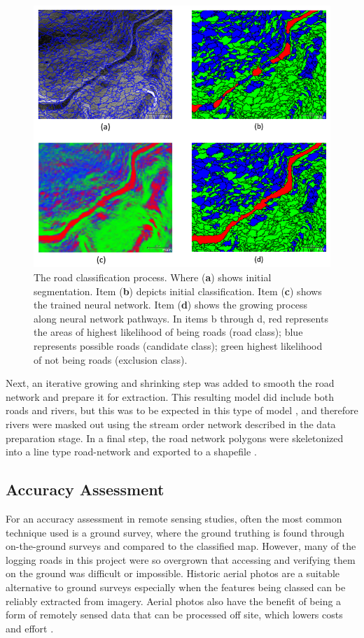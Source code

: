 \documentclass[remotesensing,article,submit,pdftex,moreauthors]{Definitions/mdpi}
\begin{document}
\begin{figure}[H]
\includegraphics[width=10.5 cm]{classify.png}
\caption{ The road classification process. Where (\textbf{a}) shows initial segmentation. Item (\textbf{b}) depicts initial classification. Item (\textbf{c}) shows the trained neural network. Item (\textbf{d}) shows the growing process along neural network pathways. In items b through d, red represents the areas of highest likelihood of being roads (road class); blue represents possible roads (candidate class); green highest likelihood of not being roads (exclusion class).}\label{fig7}
\end{figure}

Next, an iterative growing and shrinking step was added to smooth the road network and prepare it for extraction. This resulting model did include both roads and rivers, but this was to be expected in this type of model \cite{sherba}, and therefore rivers were masked out using the stream order network described in the data preparation stage. In a final step, the road network polygons were skeletonized into a line type road-network and exported to a shapefile \cite{lewandowicz}. 
\subsection{Accuracy Assessment}


For an accuracy assessment in remote sensing studies, often the most common technique used is a ground survey, where the ground truthing is found through on-the-ground surveys and compared to the classified map. However, many of the logging roads in this project were so overgrown that accessing and verifying them on the ground was difficult or impossible. Historic aerial photos are a suitable alternative to ground surveys especially when the features being classed can be reliably extracted from imagery. Aerial photos also have the benefit of being a form of remotely sensed data that can be processed off site, which lowers costs and effort \cite{lillesand}.  
\end{document}
